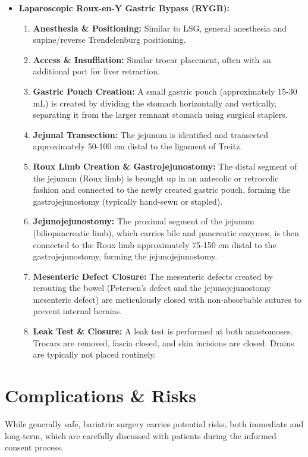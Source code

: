 \begin{itemize}
  \item \textbf{Laparoscopic Roux-en-Y Gastric Bypass (RYGB):}
    \begin{enumerate}
      \item \textbf{Anesthesia \& Positioning:} Similar to LSG, general anesthesia and supine/reverse Trendelenburg positioning.
      \item \textbf{Access \& Insufflation:} Similar trocar placement, often with an additional port for liver retraction.
      \item \textbf{Gastric Pouch Creation:} A small gastric pouch (approximately 15-30 mL) is created by dividing the stomach horizontally and vertically, separating it from the larger remnant stomach using surgical staplers.
      \item \textbf{Jejunal Transection:} The jejunum is identified and transected approximately 50-100 cm distal to the ligament of Treitz.
      \item \textbf{Roux Limb Creation \& Gastrojejunostomy:} The distal segment of the jejunum (Roux limb) is brought up in an antecolic or retrocolic fashion and connected to the newly created gastric pouch, forming the gastrojejunostomy (typically hand-sewn or stapled).
      \item \textbf{Jejunojejunostomy:} The proximal segment of the jejunum (biliopancreatic limb), which carries bile and pancreatic enzymes, is then connected to the Roux limb approximately 75-150 cm distal to the gastrojejunostomy, forming the jejunojejunostomy.
      \item \textbf{Mesenteric Defect Closure:} The mesenteric defects created by rerouting the bowel (Petersen's defect and the jejunojejunostomy mesenteric defect) are meticulously closed with non-absorbable sutures to prevent internal hernias.
      \item \textbf{Leak Test \& Closure:} A leak test is performed at both anastomoses. Trocars are removed, fascia closed, and skin incisions are closed. Drains are typically not placed routinely.
    \end{enumerate}
\end{itemize}

\section*{Complications \& Risks}
While generally safe, bariatric surgery carries potential risks, both immediate and long-term, which are carefully discussed with patients during the informed consent process.

